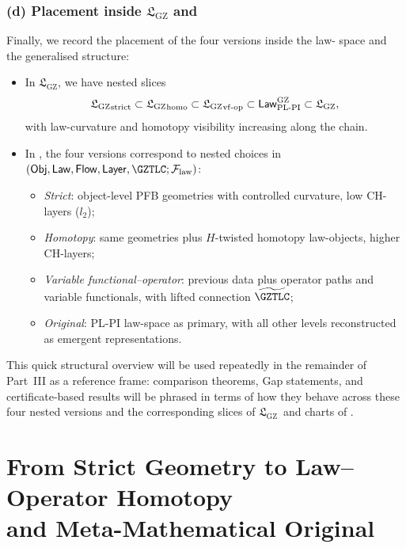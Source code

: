 \documentclass[11pt]{book}
\theoremstyle{plain}
\theoremstyle{definition}
\newcommand{\GZLS}{\ensuremath{\mathfrak{L}_{\mathrm{GZ}}}}       \newcommand{\GZLT}{\ensuremath{M_{!w}}}                           \newcommand{\GZLOC}{\ensuremath{A_M}}                             \newcommand{\GZLCurv}{\ensuremath{\mathcal{F}_{\mathrm{law}}}}
\begin{document}
\subsubsection*{(d) Placement inside \texorpdfstring{\GZLS}{GZ-LS} and \texorpdfstring{\GZGMS}{GZ-GMS}}

Finally, we record the placement of the four versions inside the law-
space and the generalised structure:

\begin{itemize}
  \item In \GZLS, we have nested slices
    \[
      {\GZLS}_{\mathrm{strict}}
      \subset
      {\GZLS}_{\mathrm{homo}}
      \subset
      {\GZLS}_{\mathrm{vf\text- op}}
      \subset
      \mathsf{Law}_{\mathrm{PL\text- PI}}^{\mathrm{GZ}}
      \subset
      \GZLS,
    \]
    with law-curvature and homotopy visibility increasing along the
    chain.
  \item In \GZGMS, the four versions correspond to nested choices in \\ 
        $(\mathsf{Obj},\mathsf{Law},\mathsf{Flow},\mathsf{Layer},
          \GZTLC;\GZLCurv)$:
    \begin{itemize}
      \item \emph{Strict}: object-level PFB geometries with controlled
            curvature, low CH-layers ($l_2$);
      \item \emph{Homotopy}: same geometries plus $H$-twisted homotopy
            law-objects, higher CH-layers;
      \item \emph{Variable functional--operator}: previous data plus
            operator paths and variable functionals, with lifted
            connection $\widetilde{\GZTLC}$;
      \item \emph{Original}: PL-PI law-space as primary, with all other
            levels reconstructed as emergent representations.
    \end{itemize}
\end{itemize}

This quick structural overview will be used repeatedly in the remainder
of Part~III as a reference frame: comparison theorems, Gap statements,
and certificate-based results will be phrased in terms of how they
behave across these four nested versions and the corresponding slices of
\GZLS\ and charts of \GZGMS.



\section[From Strict Geometry to Law--Operator Homotopy]{From Strict Geometry to Law--Operator Homotopy \\
         and Meta-Mathematical Original}
\end{document}

